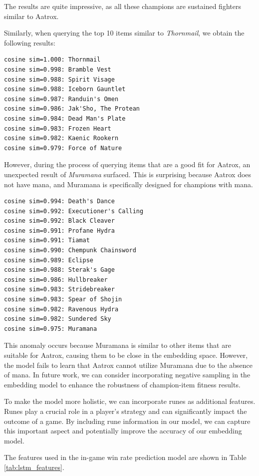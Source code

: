 \documentclass[11pt,a4paper,oneside]{report}
\begin{document}
The results are quite impressive, as all these champions are sustained fighters similar to Aatrox.

Similarly, when querying the top 10 items similar to \textit{Thornmail}, we obtain the following results:

\begin{verbatim}
cosine sim=1.000: Thornmail
cosine sim=0.998: Bramble Vest
cosine sim=0.988: Spirit Visage
cosine sim=0.988: Iceborn Gauntlet
cosine sim=0.987: Randuin's Omen
cosine sim=0.986: Jak'Sho, The Protean
cosine sim=0.984: Dead Man's Plate
cosine sim=0.983: Frozen Heart
cosine sim=0.982: Kaenic Rookern
cosine sim=0.979: Force of Nature
\end{verbatim}

However, during the process of querying items that are a good fit for Aatrox, an unexpected result of \textit{Muramana} surfaced. This is surprising because Aatrox does not have mana, and Muramana is specifically designed for champions with mana.

\begin{verbatim}
cosine sim=0.994: Death's Dance
cosine sim=0.992: Executioner's Calling
cosine sim=0.992: Black Cleaver
cosine sim=0.991: Profane Hydra
cosine sim=0.991: Tiamat
cosine sim=0.990: Chempunk Chainsword
cosine sim=0.989: Eclipse
cosine sim=0.988: Sterak's Gage
cosine sim=0.986: Hullbreaker
cosine sim=0.983: Stridebreaker
cosine sim=0.983: Spear of Shojin
cosine sim=0.982: Ravenous Hydra
cosine sim=0.982: Sundered Sky
cosine sim=0.975: Muramana
\end{verbatim}

This anomaly occurs because Muramana is similar to other items that are suitable for Aatrox, causing them to be close in the embedding space. However, the model fails to learn that Aatrox cannot utilize Muramana due to the absence of mana. In future work, we can consider incorporating negative sampling in the embedding model to enhance the robustness of champion-item fitness results.

To make the model more holistic, we can incorporate runes as additional features. Runes play a crucial role in a player's strategy and can significantly impact the outcome of a game. By including rune information in our model, we can capture this important aspect and potentially improve the accuracy of our embedding model.

The features used in the in-game win rate prediction model are shown in Table \ref{tab:lstm_features}.
\end{document}
